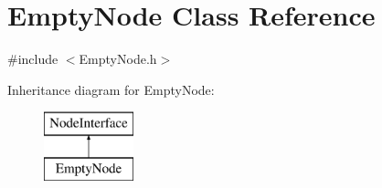 \hypertarget{class_empty_node}{}\section{Empty\+Node Class Reference}
\label{class_empty_node}


{\ttfamily \#include $<$Empty\+Node.\+h$>$}

Inheritance diagram for Empty\+Node\+:\begin{figure}[H]
\begin{center}
\leavevmode
\includegraphics[height=2.000000cm]{class_empty_node}
\end{center}
\end{figure}
